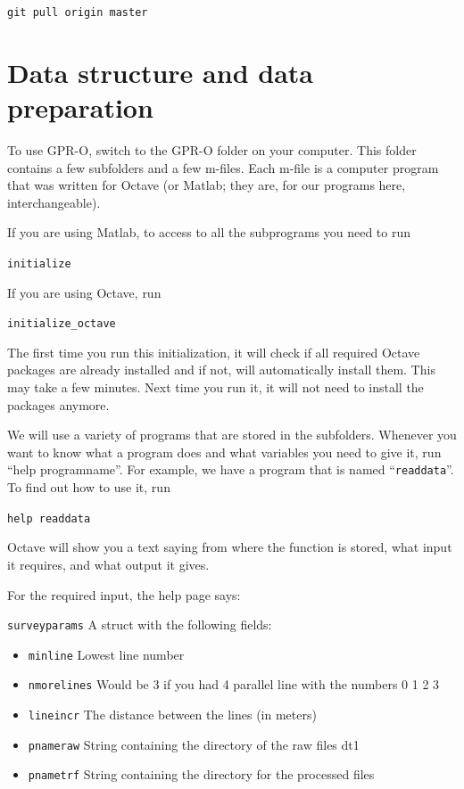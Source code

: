 \documentclass[11pt]{article}
\begin{document}
\qquad \verb#git pull origin master#


\section{Data structure and data preparation}

To use GPR-O, switch to the GPR-O folder on your computer. This folder
contains a few subfolders and a few m-files. Each m-file is a computer
program that was written for Octave (or Matlab; they are, for our
programs here, interchangeable).

If you are using Matlab, to access to all the subprograms you need to run

\qquad \verb#initialize#

If you are using Octave, run

\qquad \verb#initialize_octave#

The first time you run this initialization, it will check if
all required Octave packages are already installed and if not, will
automatically install them. This may take a few minutes. Next time you
run it, it will not need to install the packages anymore.

We will use a variety of programs that are stored in the
subfolders. Whenever you want to know what a program does and what
variables you need to give it, run ``help programname''. For example,
we have a program that is named ``\verb#readdata#''. To find out how to use
it, run

\qquad \verb#help readdata#

Octave will show you a text saying from where the function is stored, what
input it requires, and what output it gives.

For the required input, the help page says:

\verb#surveyparams# A struct with the following fields:
\begin{itemize}
\item \verb#minline# Lowest line number
\item \verb#nmorelines# Would be 3 if you had 4 parallel line with the numbers 0 1 2 3
\item \verb"lineincr" The distance between the lines (in meters)
\item \verb#pnameraw# String containing the directory of the raw files dt1
\item \verb#pnametrf# String containing the directory for the processed files
\end{itemize}
 
\end{document}
